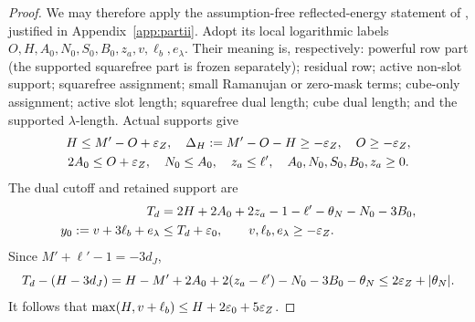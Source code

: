 \begin{proof}
We may therefore apply the assumption-free reflected-energy statement of , justified in Appendix~\ref{app:partii}. Adopt its local logarithmic labels $O,H,A_0,N_0,S_0,B_0,z_a,v,\ell_b,e_\lambda$. Their meaning is, respectively: powerful row part (the supported squarefree part is frozen separately); residual row; active non-slot support; squarefree assignment; small Ramanujan or zero-mask terms; cube-only assignment; active slot length; squarefree dual length; cube dual length; and the supported $\lambda$-length. Actual supports give
\begin{gather}\label{eq:supportlow}
 H\le M'-O+\varepsilon_Z,\quad \Delta_H:=M'-O-H\ge-\varepsilon_Z,\quad
 O\ge-\varepsilon_Z,\\
 2A_0\le O+\varepsilon_Z,\quad N_0\le A_0,\quad z_a\le\ell',\quad
 A_0,N_0,S_0,B_0,z_a\ge0.\notag
\end{gather}
The dual cutoff and retained support are
\begin{align*}
 T_d&=2H+2A_0+2z_a-1-\ell'-\theta_N-N_0-3B_0,\\
 y_0:=v+3\ell_b+e_\lambda&\le T_d+\varepsilon_0,
 \qquad v,\ell_b,e_\lambda\ge-\varepsilon_Z.
\end{align*}
Since $M'+\ell'-1=-3d_J$,
\[
 T_d-(H-3d_J)=H-M'+2A_0+2(z_a-\ell')-N_0-3B_0-\theta_N
 \le2\varepsilon_Z+|\theta_N|.
\]
It follows that $\max(H,v+\ell_b)\le H+2\varepsilon_0+5\varepsilon_Z$.


\end{proof}
